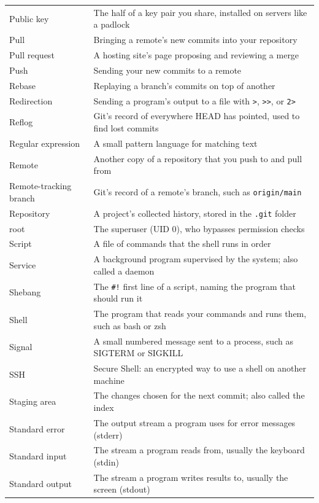 \begin{booktable}
\begin{longtable}{>{\raggedright\arraybackslash}p{}>{\raggedright\arraybackslash}p{}}
Public key & The half of a key pair you share, installed on servers like a padlock \\
Pull & Bringing a remote's new commits into your repository \\
Pull request & A hosting site's page proposing and reviewing a merge \\
Push & Sending your new commits to a remote \\
Rebase & Replaying a branch's commits on top of another \\
Redirection & Sending a program's output to a file with \texttt{\textgreater{}},
\texttt{\textgreater{}\textgreater{}}, or \texttt{2\textgreater{}} \\
Reflog & Git's record of everywhere HEAD has pointed, used to find lost commits \\
Regular expression & A small pattern language for matching text \\
Remote & Another copy of a repository that you push to and pull from \\
Remote-tracking branch & Git's record of a remote's branch, such as \texttt{origin/main} \\
Repository & A project's collected history, stored in the \texttt{.git} folder \\
root & The superuser (UID 0), who bypasses permission checks \\
Script & A file of commands that the shell runs in order \\
Service & A background program supervised by the system; also called a daemon \\
Shebang & The \texttt{\#!} first line of a script, naming the program that should
run it \\
Shell & The program that reads your commands and runs them, such as bash or zsh \\
Signal & A small numbered message sent to a process, such as SIGTERM or SIGKILL \\
SSH & Secure Shell: an encrypted way to use a shell on another machine \\
Staging area & The changes chosen for the next commit; also called the index \\
Standard error & The output stream a program uses for error messages (stderr) \\
Standard input & The stream a program reads from, usually the keyboard (stdin) \\
Standard output & The stream a program writes results to, usually the screen (stdout) \\

\end{longtable}
\end{booktable}
